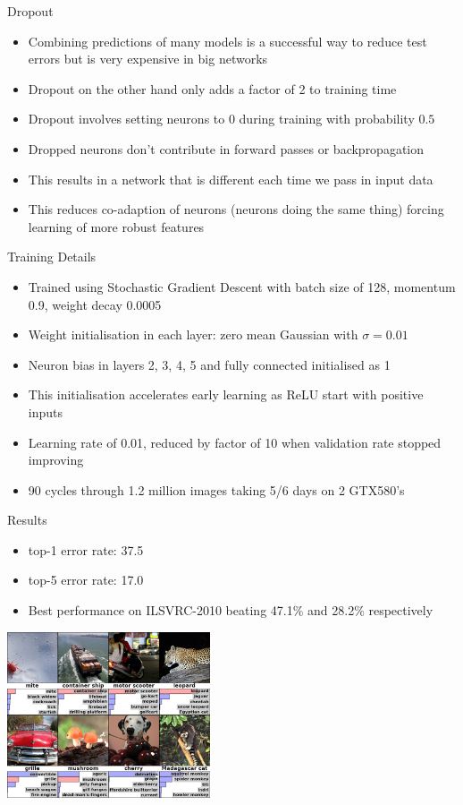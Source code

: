 \documentclass{beamer}
\begin{document}
\begin{frame}{Dropout}
	\begin{itemize}
		\item Combining predictions of many models is a successful way to reduce test errors but is very expensive in big networks
		\item Dropout on the other hand only adds a factor of 2 to training time
		\item Dropout involves setting neurons to 0 during training with probability $0.5$
		\item Dropped neurons don't contribute in forward passes or backpropagation
		\item This results in a network that is different each time we pass in input data
		\item This reduces co-adaption of neurons (neurons doing the same thing) forcing learning of more robust features
	\end{itemize}
\end{frame}

\begin{frame}{Training Details}
	\begin{itemize}
		\item Trained using Stochastic Gradient Descent with batch size of 128, momentum 0.9, weight decay 0.0005
		\item Weight initialisation in each layer: zero mean Gaussian with $\sigma=0.01$
		\item Neuron bias in layers 2, 3, 4, 5 and fully connected initialised as 1
		\item This initialisation accelerates early learning as ReLU start with positive inputs
		\item Learning rate of 0.01, reduced by factor of 10 when validation rate stopped improving
		\item 90 cycles through 1.2 million images taking 5/6 days on 2 GTX580's
	\end{itemize}
\end{frame}

\begin{frame}{Results}
	\begin{itemize}
		\item top-1 error rate: 37.5%
		\item top-5 error rate: 17.0%
		\item Best performance on ILSVRC-2010 beating 47.1\% and 28.2\% respectively 	
	\end{itemize}
	\begin{center}
		\includegraphics[width=6cm]{results}
	\end{center}
\end{frame}
\end{document}

